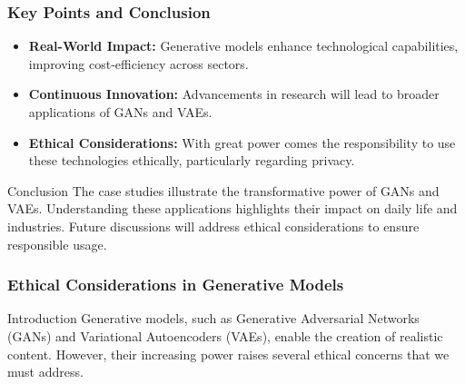 \documentclass[aspectratio=169]{beamer}
\begin{document}
\begin{frame}[fragile]
    \frametitle{Key Points and Conclusion}
    \begin{itemize}
        \item \textbf{Real-World Impact:} Generative models enhance technological capabilities, improving cost-efficiency across sectors.
        \item \textbf{Continuous Innovation:} Advancements in research will lead to broader applications of GANs and VAEs.
        \item \textbf{Ethical Considerations:} With great power comes the responsibility to use these technologies ethically, particularly regarding privacy.
    \end{itemize}
    
    \begin{block}{Conclusion}
        The case studies illustrate the transformative power of GANs and VAEs. Understanding these applications highlights their impact on daily life and industries. Future discussions will address ethical considerations to ensure responsible usage.
    \end{block}
\end{frame}

\begin{frame}[fragile]
    \frametitle{Ethical Considerations in Generative Models}
    \begin{block}{Introduction}
        Generative models, such as Generative Adversarial Networks (GANs) and Variational Autoencoders (VAEs), enable the creation of realistic content. However, their increasing power raises several ethical concerns that we must address.
    \end{block}
\end{frame}
\end{document}
